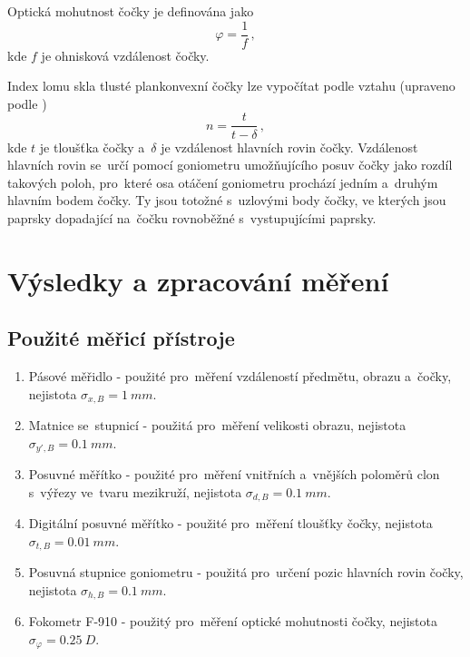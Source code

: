 \documentclass{../concepts/titul_zprava_p/prepareprotokolZprava} %
\begin{document}
Optická mohutnost čočky je definována jako \cite{wiki}
\begin{equation}
    \label{eq:mohutnost}
    \varphi = \frac{1}{f} \,,
\end{equation}
kde $f$ je ohnisková vzdálenost čočky.

Index lomu skla tlusté plankonvexní čočky lze vypočítat podle vztahu (upraveno podle \cite{studijni})
\begin{equation}
    \label{eq:index_lomu}
    n = \frac{t}{t-\delta} \,,
\end{equation}
kde $t$ je tloušťka čočky a~$\delta$ je vzdálenost hlavních rovin čočky. Vzdálenost hlavních rovin
se~určí pomocí goniometru umožňujícího posuv čočky jako rozdíl takových poloh, pro~které osa otáčení goniometru
prochází jedním a~druhým hlavním bodem čočky. Ty jsou totožné s~uzlovými body čočky, ve kterých jsou paprsky dopadající 
na~čočku rovnoběžné s~vystupujícími paprsky.




\section{Výsledky a zpracování měření}


\subsection{Použité měřicí přístroje}
\begin{enumerate}
    \item Pásové měřidlo - použité pro~měření vzdáleností předmětu, obrazu a~čočky, nejistota $\sigma_{x,B} = \qty{1}{mm}$.
    \item Matnice se~stupnicí - použitá pro~měření velikosti obrazu, nejistota $\sigma_{y',B} = \qty{0.1}{mm}$.
    \item Posuvné měřítko - použité pro~měření vnitřních a~vnějších poloměrů clon s~výřezy ve~tvaru mezikruží,
    nejistota $\sigma_{d,B} = \qty{0.1}{mm}$.
    \item Digitální posuvné měřítko - použité pro~měření tloušťky čočky, nejistota $\sigma_{t,B} = \qty{0.01}{mm}$.
    \item Posuvná stupnice goniometru - použitá pro~určení pozic hlavních rovin čočky, nejistota $\sigma_{h,B} = \qty{0.1}{mm}$.
    \item Fokometr F-910 - použitý pro~měření optické mohutnosti čočky, nejistota $\sigma_\varphi = \qty{0.25}{D}$.
\end{enumerate}
\end{document}
